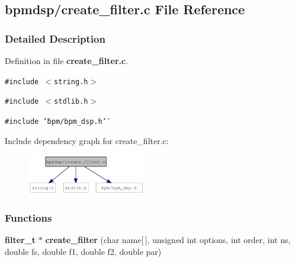 \subsection{bpmdsp/create\_\-filter.c File Reference}
\label{create__filter_8c}


\subsubsection{Detailed Description}


Definition in file {\bf create\_\-filter.c}.

{\tt \#include $<$string.h$>$}\par
{\tt \#include $<$stdlib.h$>$}\par
{\tt \#include \char`\"{}bpm/bpm\_\-dsp.h\char`\"{}}\par


Include dependency graph for create\_\-filter.c:\nopagebreak
\begin{figure}[H]
\begin{center}
\leavevmode
\includegraphics[width=146pt]{create__filter_8c__incl}
\end{center}
\end{figure}
\subsubsection*{Functions}
\begin{CompactItemize}
\item 
{\bf filter\_\-t} $\ast$ {\bf create\_\-filter} (char name[$\,$], unsigned int options, int order, int ns, double fs, double f1, double f2, double par)
\end{CompactItemize}
